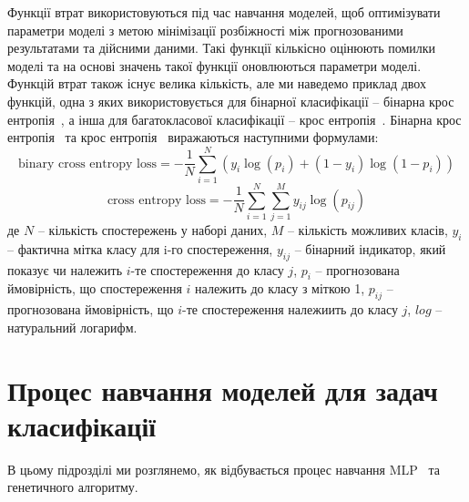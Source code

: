 Функції втрат використовуються під час навчання моделей, щоб оптимізувати параметри моделі з метою мінімізації розбіжності між прогнозованими результатами та дійсними даними. Такі функції кількісно оцінюють помилки моделі та на основі значень такої функції оновлюються параметри моделі. Функцій втрат також існує велика кількість, але ми наведемо приклад двох функцій, одна з яких використовується для бінарної класифікації -- бінарна крос ентропія~\cite{ct27}, а інша для багатокласової класифікації -- крос ентропія~\cite{ct28}. Бінарна крос ентропія~\cite{ct27} та крос ентропія~\cite{ct28} виражаються наступними формулами:
\begin{equation}
	\label{eq:binary_cross_entropy}
	\text{binary cross entropy loss} = -\frac{1}{N} \sum_{i=1}^{N} \left( y_i \log(p_i) + (1 - y_i) \log(1 - p_i) \right)
\end{equation}
\begin{equation}
	\label{eq:cross_entropy}
	\text{cross entropy loss} = -\frac{1}{N} \sum_{i=1}^{N} \sum_{j=1}^{M} y_{ij} \log(p_{ij})
\end{equation}
де $N$ -- кількість спостережень у наборі даних, $M$ -- кількість можливих класів, $y_i$ -- фактична мітка класу для i-го спостереження, $y_{ij}$ -- бінарний індикатор, який показує чи належить $i$-те спостереження до класу $j$, $p_i$ -- прогнозована ймовірність, що спостереження $i$ належить до класу з міткою 1, $p_{ij}$ -- прогнозована ймовірність, що $i$-те спостереження належиить до класу $j$, $log$ -- натуральний логарифм.

\section{Процес навчання моделей для задач класифікації}\label{sec:training_process}


В цьому підрозділі ми розглянемо, як відбувається процес навчання MLP~\cite{ct26} та генетичного алгоритму.

